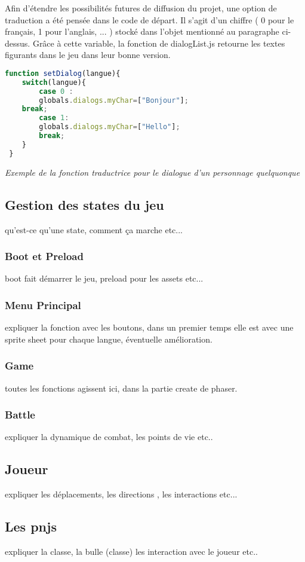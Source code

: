 \documentclass[11pt]{article}
\begin{document}
 Afin d'étendre les possibilités futures de diffusion du projet, une option de traduction a été pensée dans le code de départ. Il s'agit d'un chiffre ( 0 pour le français, 1 pour l'anglais, ... ) stocké dans l'objet mentionné au paragraphe ci-dessus. Grâce à cette variable, la fonction de dialogList.js retourne les textes figurants dans le jeu dans leur bonne version. \\
 \begin{lstlisting}[language=JavaScript]
 function setDialog(langue){
    switch(langue){
        case 0 : 
        globals.dialogs.myChar=["Bonjour"];
    break;
        case 1:
        globals.dialogs.myChar=["Hello"];
		break;
 	}
 }
\end{lstlisting}
\textit{Exemple de la fonction traductrice pour le dialogue d'un personnage quelquonque}
\subsection{Gestion des states du jeu}
qu'est-ce qu'une state, comment ça marche etc...
\subsubsection{Boot et Preload}
boot fait démarrer le jeu, preload pour les assets etc...
\subsubsection{Menu Principal}
expliquer la fonction avec les boutons, dans un premier temps elle est avec une sprite sheet pour chaque langue, éventuelle amélioration.

\subsubsection{Game}
toutes les fonctions agissent ici, dans la partie create de phaser.
\subsubsection{Battle}
expliquer la dynamique de combat, les points de vie etc..
\subsection{Joueur}
expliquer les déplacements, les directions , les interactions etc...
\subsection{Les pnjs}
expliquer la classe, la bulle (classe) 
les interaction avec le joueur etc..
\end{document}
